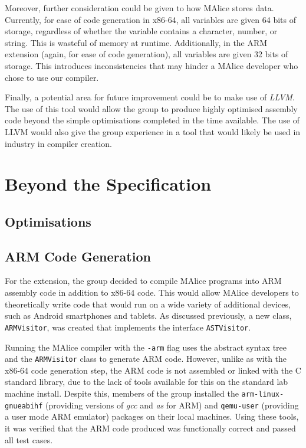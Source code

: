 \documentclass[a4wide, 11pt]{article}
\begin{document}
Moreover, further consideration could be given to how MAlice stores data. 
Currently, for ease of code generation in x86-64, all variables are given
64 bits of storage, regardless of whether the variable contains a character,
number, or string. This is wasteful of memory at runtime. Additionally, in the
ARM extension (again, for ease of code generation), all variables are given
32 bits of storage. This introduces inconsistencies that may hinder a MAlice
developer who chose to use our compiler.

Finally, a potential area for future improvement could be to make use of
\emph{LLVM}. The use of this tool would allow the group to produce highly
optimised assembly code beyond the simple optimisations completed in the time
available. The use of LLVM would also give the group experience in a tool that
would likely be used in industry in compiler creation.

\section{Beyond the Specification}

\subsection{Optimisations}

\subsection{ARM Code Generation}

For the extension, the group decided to compile MAlice programs into ARM
assembly code in addition to x86-64 code. This would allow MAlice developers
to theoretically write code that would run on a wide variety of additional
devices, such as Android smartphones and tablets. As discussed previously, 
a new class, \texttt{ARMVisitor}, was created that implements the interface
\texttt{ASTVisitor}.

Running the MAlice compiler with the \texttt{-arm} flag uses the abstract syntax
tree and the \texttt{ARMVisitor} class to generate ARM code. However, unlike 
as with the x86-64 code generation step, the ARM code is not assembled or linked
with the C standard library, due to the lack of tools available for this on the
standard lab machine install. Despite this, members of the group installed the 
\texttt{arm-linux-gnueabihf} (providing versions of \emph{gcc} and \emph{as} for 
ARM) and \texttt{qemu-user} (providing a user mode ARM emulator) packages on 
their local machines. Using these tools, it was verified that the ARM code 
produced was functionally correct and passed all test cases.
\end{document}
